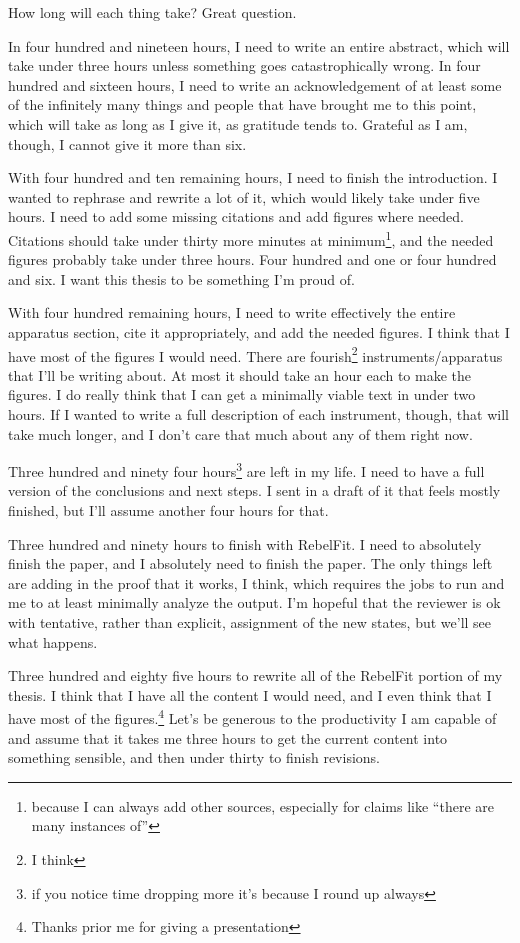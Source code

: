 \documentclass[12pt]{article}
\newcommand{\say}[1]{``#1''}
\renewcommand{\,}{\textsuperscript{,}}
\begin{document}
How long will each thing take? Great question.

In four hundred and nineteen hours, I need to write an entire abstract, which will take under three hours unless something goes catastrophically wrong.  
In four hundred and sixteen hours, I need to write an acknowledgement of at least some of the infinitely many things and people that have brought me to this point, which will take as long as I give it, as gratitude tends to.  
Grateful as I am, though, I cannot give it more than six.

With four hundred and ten remaining hours, I need to finish the introduction.  
I wanted to rephrase and rewrite a lot of it, which would likely take under five hours.  
I need to add some missing citations and add figures where needed.  
Citations should take under thirty more minutes at minimum\footnote{because I can always add other sources, especially for claims like \say{there are many instances of}}, and the needed figures probably take under three hours.  
Four hundred and one or four hundred and six.  
I want this thesis to be something I'm proud of.

With four hundred remaining hours, I need to write effectively the entire apparatus section, cite it appropriately, and add the needed figures.  
I think that I have most of the figures I would need.  
There are fourish\footnote{I think} instruments/apparatus that I'll be writing about.  
At most it should take an hour each to make the figures.  
I do really think that I can get a minimally viable text in under two hours.  
If I wanted to write a full description of each instrument, though, that will take much longer, and I don't care that much about any of them right now.

Three hundred and ninety four hours\footnote{if you notice time dropping more it's because I round up always} are left in my life.  
I need to have a full version of the conclusions and next steps.  
I sent in a draft of it that feels mostly finished, but I'll assume another four hours for that.

Three hundred and ninety hours to finish with RebelFit.  
I need to absolutely finish the paper, and I absolutely need to finish the paper.  
The only things left are adding in the proof that it works, I think, which requires the jobs to run and me to at least minimally analyze the output.  
I'm hopeful that the reviewer is ok with tentative, rather than explicit, assignment of the new states, but we'll see what happens.

Three hundred and eighty five hours to rewrite all of the RebelFit portion of my thesis.  
I think that I have all the content I would need, and I even think that I have most of the figures.\footnote{Thanks prior me for giving a presentation}  
Let's be generous to the productivity I am capable of and assume that it takes me three hours to get the current content into something sensible, and then under thirty to finish revisions.
\end{document}
